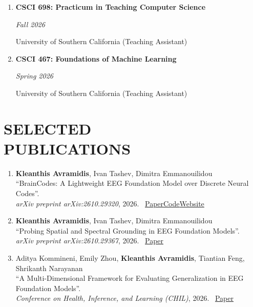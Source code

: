 \documentclass[margin]{res}
\newcommand{\cvheading}[2]{%
  \par\Needspace{4\baselineskip}\noindent
  \parbox[t]{\dimexpr\linewidth-110pt\relax}{\raggedright\bfseries #1}%
  \hfill\parbox[t]{98pt}{\raggedleft\itshape #2}%
  \par\nopagebreak[4]\vspace{-\parskip}\noindent\ignorespaces}
\begin{document}
\begin{resume}
\begin{minipage}[t]{\linewidth}
\begin{enumerate}[leftmargin=*]
    \item \cvheading{CSCI 698: Practicum in Teaching Computer Science}{Fall 2026}
    University of Southern California (Teaching Assistant)
    \item \cvheading{CSCI 467: Foundations of Machine Learning}{Spring 2026}
    University of Southern California (Teaching Assistant)
\end{enumerate}
\end{minipage}

\clearpage
\section{SELECTED \\ PUBLICATIONS}

\fontsize{9.8}{11.5}\selectfont
\begin{enumerate}[leftmargin=*,itemsep=3pt]
\raggedright
\item \begin{minipage}[t]{\linewidth}\raggedright
    \textbf{Kleanthis Avramidis}, Ivan Tashev, Dimitra Emmanouilidou \\
    ``BrainCodes: A Lightweight EEG Foundation Model over Discrete Neural Codes''. \\
    \textit{arXiv preprint arXiv:2610.29320}, 2026. \ \href{https://arxiv.org/abs/2610.29320}{Paper}\enspace \href{https://github.com/microsoft/BrainCodes}{Code}\enspace \href{https://microsoft.github.io/BrainCodes/}{Website}
\end{minipage}

\item \begin{minipage}[t]{\linewidth}\raggedright
    \textbf{Kleanthis Avramidis}, Ivan Tashev, Dimitra Emmanouilidou \\
    ``Probing Spatial and Spectral Grounding in EEG Foundation Models''. \\
    \textit{arXiv preprint arXiv:2610.29367}, 2026. \ \href{https://arxiv.org/abs/2610.29367}{Paper}
\end{minipage}

\item \begin{minipage}[t]{\linewidth}\raggedright
    Aditya Kommineni, Emily Zhou, \textbf{Kleanthis Avramidis}, Tiantian Feng, Shrikanth Narayanan \\
    ``A Multi-Dimensional Framework for Evaluating Generalization in EEG Foundation Models''. \\
    \textit{Conference on Health, Inference, and Learning (CHIL)}, 2026. \ \href{https://arxiv.org/abs/2605.28563}{Paper}
\end{minipage}


\end{enumerate}
\end{resume}
\end{document}
